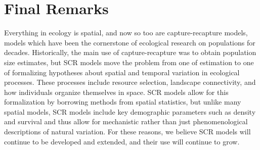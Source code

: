 \section{Final Remarks}

Everything in ecology is spatial, and now so too are capture-recapture
models, models which have been the cornerstone of ecological
research on populations for decades.
Historically, the main use of capture-recapture was to obtain population
size estimates, but
SCR models move the problem from one of estimation to one of
formalizing hypotheses about spatial and temporal variation in
ecological processes. %
These processes include resource selection, landscape connectivity, and
how individuals organize themselves in space. SCR models allow for
this formalization by borrowing methods from spatial statistics,
but unlike many spatial models,
SCR models include key demographic parameters such as density
and survival and thus allow for mechanistic rather than just
phenomenological descriptions of natural variation.
For these reasons, we believe SCR models will continue to be developed and
extended, and their use will continue to grow.

